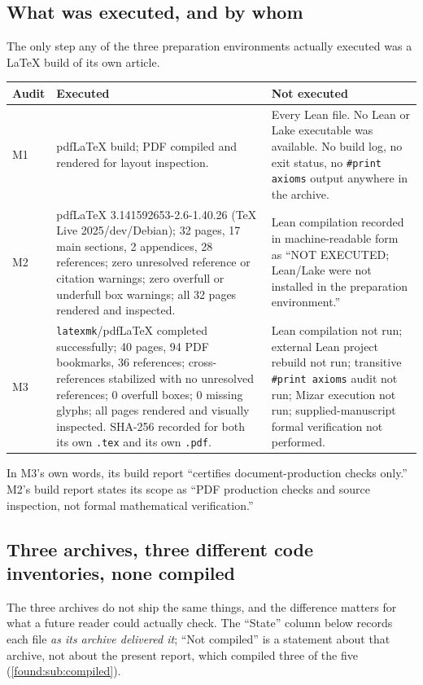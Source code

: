 \documentclass[11pt,letterpaper]{article}
\numberwithin{equation}{section}
\theoremstyle{definition}
\theoremstyle{remark}
\begin{document}
\subsection{What was executed, and by whom}
\label{found:sub:executed}
The only step any of the three preparation environments actually executed was a
\LaTeX{} build of its own article.

\begin{longtable}{@{}P{0.13\textwidth}P{0.40\textwidth}P{0.40\textwidth}@{}}
\toprule
Audit & Executed & Not executed\\
\midrule\endhead
M1 & pdf\LaTeX{} build; PDF compiled and rendered for layout inspection.
   & Every Lean file. No Lean or Lake executable was available. No build log,
     no exit status, no \texttt{\#print axioms} output anywhere in the archive.\\[0.5em]
M2 & pdf\LaTeX{} 3.141592653-2.6-1.40.26 (TeX Live 2025/dev/Debian); 32 pages,
     17 main sections, 2 appendices, 28 references; zero unresolved reference or
     citation warnings; zero overfull or underfull box warnings; all 32 pages
     rendered and inspected.
   & Lean compilation recorded in machine-readable form as
     ``NOT EXECUTED; Lean/Lake were not installed in the preparation
     environment.''\\[0.5em]
M3 & \texttt{latexmk}/pdf\LaTeX{} completed successfully; 40 pages, 94 PDF
     bookmarks, 36 references; cross-references stabilized with no unresolved
     references; 0 overfull boxes; 0 missing glyphs; all pages rendered and
     visually inspected. SHA-256 recorded for both its own \texttt{.tex} and its
     own \texttt{.pdf}.
   & Lean compilation not run; external Lean project rebuild not run; transitive
     \texttt{\#print axioms} audit not run; Mizar execution not run; supplied-manuscript
     formal verification not performed.\\
\bottomrule
\end{longtable}

\noindent In M3's own words, its build report ``certifies document-production
checks only.'' M2's build report states its scope as ``PDF production checks
and source inspection, not formal mathematical verification.''

\subsection{Three archives, three different code inventories, none compiled}
\label{found:sub:archives}
The three archives do not ship the same things, and the difference matters for
what a future reader could actually check. The ``State'' column below records
each file \emph{as its archive delivered it}; ``Not compiled'' is a statement
about that archive, not about the present report, which compiled three of the
five (\cref{found:sub:compiled}).
\end{document}
